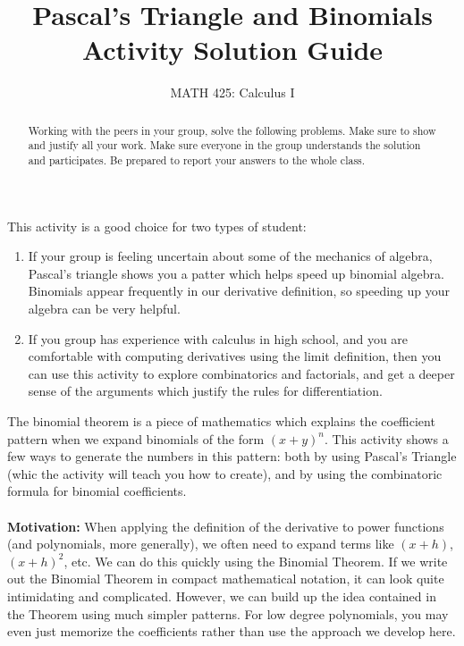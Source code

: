 \documentclass{ximera}
\title{Pascal's Triangle and Binomials Activity Solution Guide}
\author{MATH 425: Calculus I}
\begin{document}
\begin{abstract}
   Working with the peers in your group, solve the following problems. Make sure to show and justify all your work. Make sure everyone in the group understands the solution and participates. Be prepared to report your answers to the whole class. 
\end{abstract}
\maketitle

This activity is a good choice for two types of student: 
\begin{enumerate}
    \item If your group is feeling uncertain about some of the mechanics of algebra, Pascal's triangle shows you a patter which helps speed up binomial algebra.  Binomials appear frequently in our derivative definition, so speeding up your algebra can be very helpful.
    \item If you group has experience with calculus in high school, and you are comfortable with computing derivatives using the limit definition, then you can use this activity to explore combinatorics and factorials, and get a deeper sense of the arguments which justify the rules for differentiation.
\end{enumerate}


 The binomial theorem is a piece of mathematics which explains the coefficient pattern when we expand binomials of the form $(x+y)^n$.  This activity shows a few ways to generate the numbers in this pattern: both by using Pascal's Triangle (whic the activity will teach you how to create), and by using the combinatoric formula for binomial coefficients.\\
 \\
 \textbf{Motivation:} When applying the definition of the derivative to power functions (and polynomials, more generally), we often need to expand terms like $(x+h)$, $(x+h)^2$, etc.  We can do this quickly using the Binomial Theorem.  If we write out the Binomial Theorem in compact mathematical notation, it can look quite intimidating and complicated.  However, we can build up the idea contained in the Theorem using much simpler patterns.  For low degree polynomials, you may even just memorize the coefficients rather than use the approach we develop here.
\end{document}
